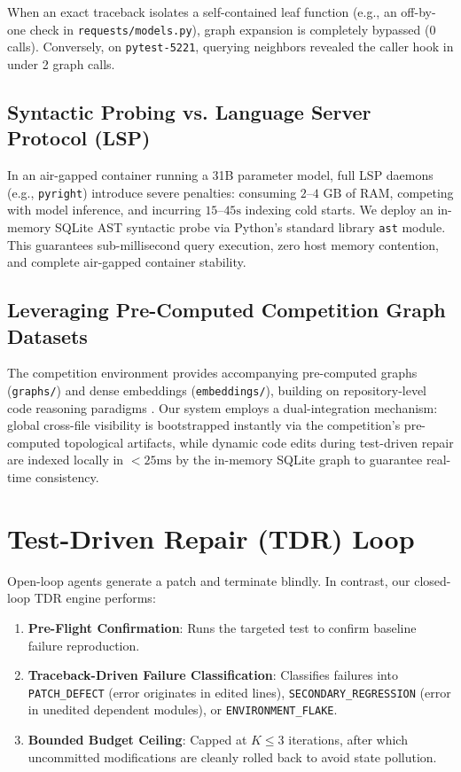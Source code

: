 \documentclass[10pt,twocolumn,letterpaper]{article}
\begin{document}
When an exact traceback isolates a self-contained leaf function (e.g., an off-by-one check in \texttt{requests/models.py}), graph expansion is completely bypassed ($0$ calls). Conversely, on \texttt{pytest-5221}, querying neighbors revealed the caller hook in under 2 graph calls.

\subsection{Syntactic Probing vs. Language Server Protocol (LSP)}
In an air-gapped container running a 31B parameter model, full LSP daemons (e.g., \texttt{pyright}) introduce severe penalties: consuming $2\text{--}4\text{ GB}$ of RAM, competing with model inference, and incurring $15\text{--}45\text{s}$ indexing cold starts. We deploy an in-memory SQLite AST syntactic probe via Python's standard library \texttt{ast} module. This guarantees sub-millisecond query execution, zero host memory contention, and complete air-gapped container stability.

\subsection{Leveraging Pre-Computed Competition Graph Datasets}
The competition environment \cite{markowitz2026gemma4competition} provides accompanying pre-computed graphs (\texttt{graphs/}) and dense embeddings (\texttt{embeddings/}), building on repository-level code reasoning paradigms \cite{bairi2023codeplan}. Our system employs a dual-integration mechanism: global cross-file visibility is bootstrapped instantly via the competition's pre-computed topological artifacts, while dynamic code edits during test-driven repair are indexed locally in $<25\text{ms}$ by the in-memory SQLite graph to guarantee real-time consistency.

\section{Test-Driven Repair (TDR) Loop}
Open-loop agents generate a patch and terminate blindly. In contrast, our closed-loop TDR engine performs:
\begin{enumerate}
    \item \textbf{Pre-Flight Confirmation}: Runs the targeted test to confirm baseline failure reproduction.
    \item \textbf{Traceback-Driven Failure Classification}: Classifies failures into \texttt{PATCH\_DEFECT} (error originates in edited lines), \texttt{SECONDARY\_REGRESSION} (error in unedited dependent modules), or \texttt{ENVIRONMENT\_FLAKE}.
    \item \textbf{Bounded Budget Ceiling}: Capped at $K \le 3$ iterations, after which uncommitted modifications are cleanly rolled back to avoid state pollution.
\end{enumerate}
\end{document}
